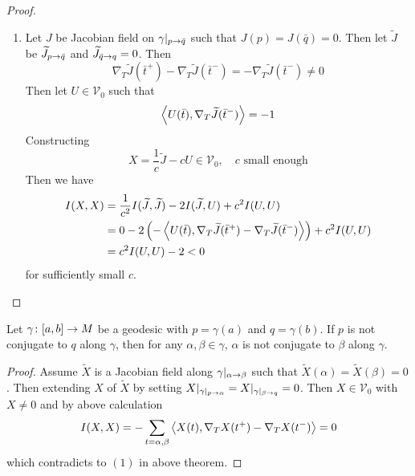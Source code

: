 \begin{enumerate}[label=\arabic{*}.]
\begin{proof}
\begin{enumerate}[label=(\arabic{*})]
			\item Let $J$ be Jacobian field on $\gamma|_{p\rightarrow \bar{q}}$ such that $J(p) = J(\bar{q}) = 0$. Then let $\widetilde{J}$ be $\widetilde{J}_{p\rightarrow \bar{q}}$ and $\widetilde{J}_{\bar{q}\rightarrow q} = 0$. Then
			\begin{equation*}
				\nabla_T\widetilde{J}(\bar{t}^+) - \nabla_T\widetilde{J}(\bar{t}^-) = - \nabla_T\widetilde{J}(\bar{t}^-) \neq 0
			\end{equation*}
			Then let $U \in \mathcal{V}_0$ such that
			\begin{equation*}
			 	\left\langle U(\bar{t}),\nabla_T\widetilde{J}(\bar{t}^-) \right\rangle = -1
			\end{equation*}
			Constructing
			\begin{equation*}
				X = \frac{1}{c}\widetilde{J} - cU \in \mathcal{V}_0,\quad c \text{ small enough}
			\end{equation*}
			Then we have
			\begin{equation*}
				\begin{aligned}
					I(X,X) &= \frac{1}{c^2}I(\widetilde{J},\widetilde{J}) -2I(\widetilde{J},U) + c^2I(U,U) \\
					&= 0 - 2\left(-\left\langle U(\bar{t}),\nabla_T\widetilde{J}(\bar{t}^+) - \nabla_T\widetilde{J}(\bar{t}^-) \right\rangle\right) + c^2I(U,U)\\
					&= c^2I(U,U) - 2 < 0
				\end{aligned}
			\end{equation*}
			for sufficiently small $c$.\qedhere
		\end{enumerate}
	\end{proof}
	\begin{cor}
		Let $\gamma \colon [a,b] \rightarrow M$ be a geodesic with $p = \gamma(a)$ and $q = \gamma(b)$. If $p$ is not conjugate to $q$ along $\gamma$, then for any $\alpha,\beta \in \gamma$, $\alpha$ is not conjugate to $\beta$ along $\gamma$.
	\end{cor}
	\begin{proof}
		Assume $\tilde{X}$ is a Jacobian field along $\gamma|_{\alpha \rightarrow \beta}$ such that $\tilde{X}(\alpha) = \tilde{X}(\beta) = 0$. Then extending $X$ of $\tilde{X}$ by setting $X|_{\gamma|_{p \rightarrow \alpha}} = X|_{\gamma|_{\beta \rightarrow q}} = 0$. Then $X \in \mathcal{V}_0$ with $X \neq 0$ and by above calculation
		\begin{equation*}
			I(X,X) = - \sum_{t = \alpha,\beta}\left\langle X(t),\nabla_TX(t^+)-\nabla_TX(t^-) \right\rangle = 0
		\end{equation*}
		which contradicts to $(1)$ in above theorem.
	\end{proof}

\end{enumerate}
